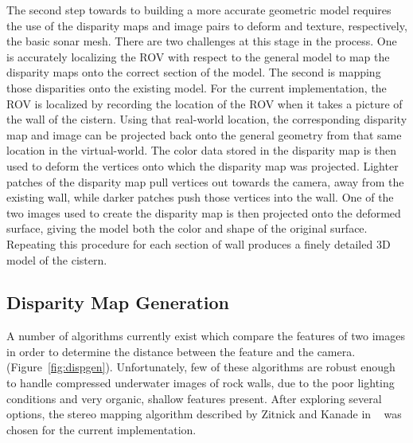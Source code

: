 \documentclass[a4paper,twoside]{article}
\begin{document}
The second step towards to building a more accurate geometric model requires the use of the disparity maps and image pairs to deform and texture, respectively, the basic sonar mesh. There are two challenges at this stage in the process.  One is accurately localizing the ROV with respect to the general model to map the disparity maps onto the correct section of the model. The second is mapping those disparities onto the existing model.
For the current implementation, the ROV is localized by recording the location of the ROV when it takes a picture of the wall of the cistern.  
Using that real-world location, the corresponding disparity map and image can be projected back onto the general geometry from that same location in the virtual-world.
The color data stored in the disparity map is then used to deform the vertices onto which the disparity map was projected.
Lighter patches of the disparity map pull vertices out towards the camera, away from the existing wall, while darker patches push those vertices into the wall.
One of the two images used to create the disparity map is then projected onto the deformed surface, giving the model both the color and shape of the original surface. Repeating this procedure for each section of wall produces a finely detailed 3D model of the cistern.

\subsection{Disparity Map Generation}

\begin{figure*}[!ht]
   \vspace{-0.2cm}
   \caption{How we generate disparity maps from images.}
  \label{fig:dispgen}
 \end{figure*}


A number of algorithms currently exist which compare the features of two images in order to determine the distance between the feature and the camera. (Figure~\ref{fig:dispgen}). 
Unfortunately, few of these algorithms are robust enough to handle compressed underwater images of rock walls, due to the poor lighting conditions and very organic, shallow features present.
After exploring several options, the stereo mapping algorithm described by Zitnick and Kanade in ~\cite{stereo:zitKan} was chosen for the current implementation.
\end{document}
